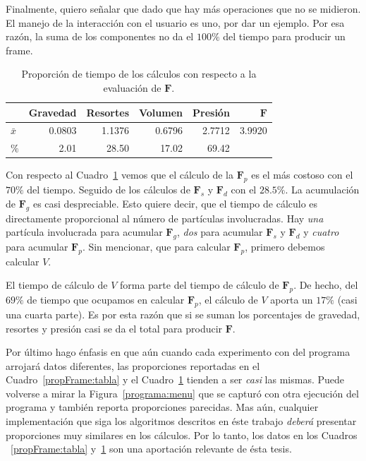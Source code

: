 Finalmente, quiero señalar que dado que hay más operaciones que no se midieron.
El manejo de la interacción con el usuario es uno, por dar un ejemplo.
Por esa razón, la suma de los componentes no da el $100\%$ del tiempo para producir un frame.

\begin{table}
\begin{center}
\begin{tabular} {@{}lrrrrr@{}}
\toprule
& Gravedad & Resortes & Volumen & Presión & $\textbf{F}$ \\ 
\midrule 
 $\bar{x}$      & 0.0803 & 1.1376 & 0.6796 & 2.7712 & 3.9920 \\
 $\%$           & 2.01 & 28.50 & 17.02 & 69.42 & \\
\bottomrule
\end{tabular}
\end{center}
\caption[Proporción de cálculos de $\textbf{F}$]{Proporción de tiempo de los cálculos con respecto a la evaluación de $\textbf{F}$.}
\label{propFuerza:tabla}
\end{table}

Con respecto al Cuadro~\ref{propFuerza:tabla} vemos que el cálculo de la $\textbf{F}_p$ es el más costoso con el $70\%$ del tiempo.
Seguido de los cálculos de $\textbf{F}_s$ y $\textbf{F}_d$ con el $28.5\%$.
La acumulación de $\textbf{F}_g$ es casi despreciable.
Esto quiere decir, que el tiempo de cálculo es directamente proporcional al número de partículas involucradas.
Hay \emph{una} partícula involucrada para acumular $\textbf{F}_g$, \emph{dos} para acumular $\textbf{F}_s$ y $\textbf{F}_d$ y \emph{cuatro} para acumular $\textbf{F}_p$.
Sin mencionar, que para calcular $\textbf{F}_p$, primero debemos calcular $V$.

El tiempo de cálculo de $V$ forma parte del tiempo de cálculo de $\textbf{F}_p$.
De hecho, del $69\%$ de tiempo que ocupamos en calcular $\textbf{F}_p$, el cálculo de $V$ aporta un $17\%$ (casi una cuarta parte).
Es por esta razón que si se suman los porcentajes de gravedad, resortes y presión casi se da el total para producir $\textbf{F}$.

Por último hago énfasis en que aún cuando cada experimento con del programa arrojará datos diferentes, las proporciones reportadas en el Cuadro~\ref{propFrame:tabla} y el  Cuadro~\ref{propFuerza:tabla} tienden a ser \emph{casi} las mismas.
Puede volverse a mirar la Figura~\ref{programa:menu} que se capturó con otra ejecución del programa y también reporta proporciones parecidas.
Mas aún, cualquier implementación que siga los algoritmos descritos en éste trabajo \emph{deberá} presentar proporciones muy similares en los cálculos.
Por lo tanto, los datos en los Cuadros ~\ref{propFrame:tabla} y~\ref{propFuerza:tabla} son una aportación relevante de ésta tesis.
